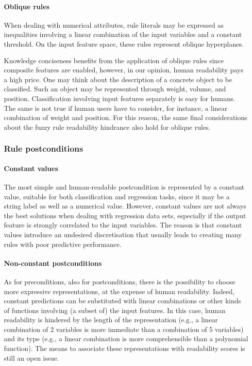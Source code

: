 \documentclass[sigconf]{acmart}
\begin{document}
\paragraph{Oblique rules}

When dealing with numerical attributes, rule literals may be expressed as inequalities involving a linear combination of the input variables and a constant threshold.
%
On the input feature space, these rules represent oblique hyperplanes.

Knowledge conciseness benefits from the application of oblique rules since composite features are enabled, however, in our opinion, human readability pays a high price.
%
One may think about the description of a concrete object to be classified.
%
Such an object may be represented through weight, volume, and position.
%
Classification involving input features separately is easy for humans.
%
The same is not true if human users have to consider, for instance, a linear combination of weight and position.
%
For this reason, the same final considerations about the fuzzy rule readability hindrance also hold for oblique rules.

\subsubsection{Rule postconditions}

\paragraph{Constant values}

The most simple and human-readable postcondition is represented by a constant value, suitable for both classification and regression tasks, since it may be a string label as well as a numerical value.
%
However, constant values are not always the best solutions when dealing with regression data sets, especially if the output feature is strongly correlated to the input variables.
%
The reason is that constant values introduce an undesired discretisation that usually leads to creating many rules with poor predictive performance.

\paragraph{Non-constant postconditions}

As for preconditions, also for postconditions, there is the possibility to choose more expressive representations, at the expense of human readability.
%
Indeed, constant predictions can be substituted with linear combinations or other kinds of functions involving (a subset of) the input features.
%
In this case, human readability is hindered by the length of the representation (e.g., a linear combination of 2 variables is more immediate than a combination of 5 variables) and its type (e.g., a linear combination is more comprehensible than a polynomial function).
%
The means to associate these representations with readability scores is still an open issue.
\end{document}
